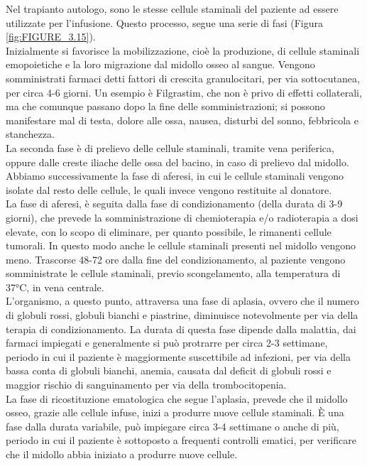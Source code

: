 Nel trapianto autologo, sono le stesse cellule staminali del paziente ad essere utilizzate per l’infusione. 
Questo processo, segue una serie di fasi (Figura \ref{fig:FIGURE_3.15}).\\
Inizialmente si favorisce la mobilizzazione, cioè la produzione, di cellule staminali emopoietiche e la 
loro migrazione dal midollo osseo al sangue. Vengono somministrati farmaci detti fattori di crescita granulocitari, 
per via sottocutanea, per circa 4-6 giorni\cite{TRAPIANTO}. Un esempio è Filgrastim, che non è privo di effetti 
collaterali, ma che comunque passano dopo la fine delle somministrazioni; si possono manifestare mal di testa, 
dolore alle ossa, nausea, disturbi del sonno, febbricola e stanchezza\cite{STEMCELLS}.\\
La seconda fase è di prelievo delle cellule staminali, tramite vena periferica, oppure dalle creste iliache delle 
ossa del bacino, in caso di prelievo dal midollo.\\ 
Abbiamo successivamente la fase di aferesi, in cui le cellule staminali vengono isolate dal resto delle cellule, 
le quali invece vengono restituite al donatore.\\ 
La fase di aferesi, è seguita dalla fase di condizionamento (della durata di 3-9 giorni), che prevede la 
somministrazione di chemioterapia e/o radioterapia a dosi elevate, con lo scopo di eliminare, 
per quanto possibile, le rimanenti cellule tumorali. In questo modo anche 
le cellule staminali presenti nel midollo vengono meno. Trascorse 48-72 ore dalla fine del condizionamento, 
al paziente vengono somministrate le cellule staminali, previo scongelamento, alla temperatura di 37°C, 
in vena centrale\cite{TRAPIANTO}.\\
L’organismo, a questo punto, attraversa una fase di aplasia, ovvero che il numero di globuli rossi, globuli bianchi e 
piastrine, diminuisce notevolmente per via della terapia di condizionamento. La durata di questa fase dipende 
dalla malattia, dai farmaci impiegati e generalmente si può protrarre per circa 2-3 settimane\cite{TRAPIANTO}, 
periodo in cui il paziente è maggiormente suscettibile ad infezioni, per via della bassa conta di globuli bianchi, 
anemia, causata dal deficit di globuli rossi e maggior rischio di sanguinamento per via della trombocitopenia\cite{LLSBLOOD}.\\
La fase di ricostituzione ematologica che segue l’aplasia, prevede che il midollo osseo, grazie alle cellule infuse, 
inizi a produrre nuove cellule staminali\cite{TRAPIANTO}.
È una fase dalla durata variabile, può impiegare circa 3-4 settimane o anche di più, periodo in cui il paziente 
è sottoposto a frequenti controlli ematici, per verificare che il midollo abbia iniziato a produrre nuove cellule\cite{LLSBLOOD}.\\

